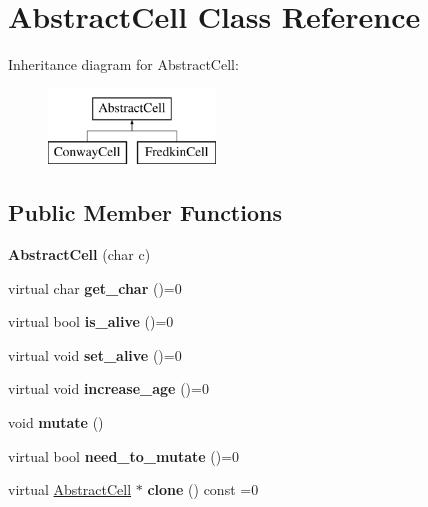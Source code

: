 \hypertarget{classAbstractCell}{\section{\-Abstract\-Cell \-Class \-Reference}
\label{classAbstractCell}
}
\-Inheritance diagram for \-Abstract\-Cell\-:\begin{figure}[H]
\begin{center}
\leavevmode
\includegraphics[height=2.000000cm]{classAbstractCell}
\end{center}
\end{figure}
\subsection*{\-Public \-Member \-Functions}
\begin{DoxyCompactItemize}
\item 
\hypertarget{classAbstractCell_a5430f556878146c3b903bc0e5d1b9e6c}{{\bfseries \-Abstract\-Cell} (char c)}\label{classAbstractCell_a5430f556878146c3b903bc0e5d1b9e6c}

\item 
\hypertarget{classAbstractCell_a8da9156bda7bb03749cdad7220021e29}{virtual char {\bfseries get\-\_\-char} ()=0}\label{classAbstractCell_a8da9156bda7bb03749cdad7220021e29}

\item 
\hypertarget{classAbstractCell_a8cd6bfe4ddc90c3f7f90debc2f2055bb}{virtual bool {\bfseries is\-\_\-alive} ()=0}\label{classAbstractCell_a8cd6bfe4ddc90c3f7f90debc2f2055bb}

\item 
\hypertarget{classAbstractCell_ad14ccb233e6bddba3b2d167ce5cb77fe}{virtual void {\bfseries set\-\_\-alive} ()=0}\label{classAbstractCell_ad14ccb233e6bddba3b2d167ce5cb77fe}

\item 
\hypertarget{classAbstractCell_abd8f706b58de36e091edb7e148dee2ad}{virtual void {\bfseries increase\-\_\-age} ()=0}\label{classAbstractCell_abd8f706b58de36e091edb7e148dee2ad}

\item 
\hypertarget{classAbstractCell_a612c2b5f22052fc35388eaae21dc5b9e}{void {\bfseries mutate} ()}\label{classAbstractCell_a612c2b5f22052fc35388eaae21dc5b9e}

\item 
\hypertarget{classAbstractCell_a347714c2d0b246fe234b6a47856f6e1e}{virtual bool {\bfseries need\-\_\-to\-\_\-mutate} ()=0}\label{classAbstractCell_a347714c2d0b246fe234b6a47856f6e1e}

\item 
\hypertarget{classAbstractCell_a1a95a7ea92b3503e2f042170b6320354}{virtual \hyperlink{classAbstractCell}{\-Abstract\-Cell} $\ast$ {\bfseries clone} () const =0}\label{classAbstractCell_a1a95a7ea92b3503e2f042170b6320354}

\end{DoxyCompactItemize}
